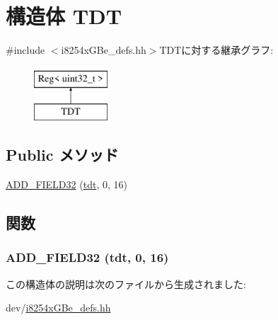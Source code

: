 \hypertarget{structiGbReg_1_1Regs_1_1TDT}{
\section{構造体 TDT}
\label{structiGbReg_1_1Regs_1_1TDT}
}


{\ttfamily \#include $<$i8254xGBe\_\-defs.hh$>$}TDTに対する継承グラフ:\begin{figure}[H]
\begin{center}
\leavevmode
\includegraphics[height=2cm]{structiGbReg_1_1Regs_1_1TDT}
\end{center}
\end{figure}
\subsection*{Public メソッド}
\begin{DoxyCompactItemize}
\item 
\hyperlink{structiGbReg_1_1Regs_1_1TDT_a9a8d7e85f89718071ee65db419ba2f43}{ADD\_\-FIELD32} (\hyperlink{structiGbReg_1_1Regs_a928dc76d0b5b003d9336bee496f78089}{tdt}, 0, 16)
\end{DoxyCompactItemize}


\subsection{関数}
\hypertarget{structiGbReg_1_1Regs_1_1TDT_a9a8d7e85f89718071ee65db419ba2f43}{
\subsubsection[{ADD\_\-FIELD32}]{\setlength{\rightskip}{0pt plus 5cm}ADD\_\-FIELD32 ({\bf tdt}, \/  0, \/  16)}}
\label{structiGbReg_1_1Regs_1_1TDT_a9a8d7e85f89718071ee65db419ba2f43}


この構造体の説明は次のファイルから生成されました:\begin{DoxyCompactItemize}
\item 
dev/\hyperlink{i8254xGBe__defs_8hh}{i8254xGBe\_\-defs.hh}\end{DoxyCompactItemize}
